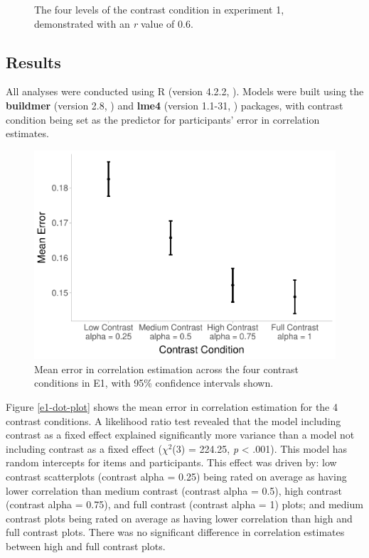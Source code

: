 \documentclass[preprint, 3p,
authoryear]{elsarticle} %
\begin{document}
\begin{figure}
\caption{\label{e1-example-plots}The four levels of the contrast condition in experiment 1, demonstrated with an \textit{r} value of 0.6.}\label{fig:e1-example-plots}
\end{figure}

\hypertarget{results}{%
\subsection{Results}\label{results}}

All analyses were conducted using R (version 4.2.2, \citealp{r_core}).
Models were built using the \textbf{buildmer} (version 2.8,
\citealp{voeten_buildmer_2022}) and \textbf{lme4} (version 1.1-31,
\citealp{bates_lme4_2015}) packages, with contrast condition being set
as the predictor for participants' error in correlation estimates.

\begin{figure}

\includegraphics[width=0.5\linewidth]{contrast_and_scatterplots_files/figure-latex/e1-dot-plot-1} \hfill{}

\caption{\label{e1-dot-plot}Mean error in correlation estimation across the four contrast conditions in E1, with 95\% confidence intervals shown.}\label{fig:e1-dot-plot}
\end{figure}

Figure \ref{e1-dot-plot} shows the mean error in correlation estimation
for the 4 contrast conditions. A likelihood ratio test revealed that the
model including contrast as a fixed effect explained significantly more
variance than a model not including contrast as a fixed effect
(\(\chi^2\)(3) = 224.25, \emph{p} \textless{} .001). This model has
random intercepts for items and participants. This effect was driven by:
low contrast scatterplots (contrast alpha = 0.25) being rated on average
as having lower correlation than medium contrast (contrast alpha = 0.5),
high contrast (contrast alpha = 0.75), and full contrast (contrast alpha
= 1) plots; and medium contrast plots being rated on average as having
lower correlation than high and full contrast plots. There was no
significant difference in correlation estimates between high and full
contrast plots.
\end{document}
